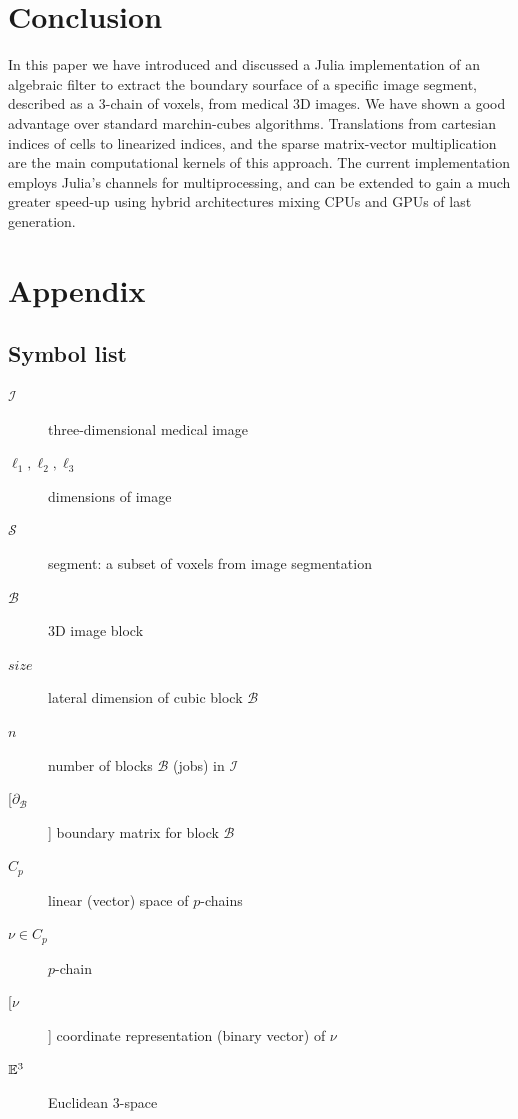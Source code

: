 \documentclass[11pt, oneside]{amsart}   	%
\begin{document}
%
\section{Conclusion}\label{sec:conclusion}

In this paper we have introduced and discussed a Julia implementation of an algebraic filter to extract the boundary sourface of a specific image segment, described as a 3-chain of voxels, from medical 3D images. We have shown a good advantage over standard marchin-cubes algorithms. Translations from cartesian indices of cells to linearized indices, and the sparse matrix-vector multiplication are the main computational kernels of this approach. The current implementation employs Julia's channels for multiprocessing, and can be extended to gain a much greater speed-up using hybrid architectures mixing  CPUs and GPUs of last generation. 

\appendix
\section{Appendix}
\subsection{Symbol list}

\begin{description}
\item[$\mathcal{I}$]  three-dimensional medical image
\item[$\ell_1, \ell_2, \ell_3$]  dimensions of image
\item[$\mathcal{S}$]  segment: a subset of voxels from image segmentation
\item[$\mathcal{B}$] 3D image block
\item[$size$] lateral dimension of cubic block $\mathcal{B}$
\item[$n$]	number of blocks $\mathcal{B}$ (jobs) in $\mathcal{I}$
\item[[$\partial_\mathcal{B}$] ]  boundary matrix for block $\mathcal{B}$
\item[$C_p$] linear (vector) space of $p$-chains
\item[$\nu\in C_p$] $p$-chain
\item[[$\nu$]] coordinate representation (binary vector) of  $\nu$
\item[$\mathbb{E}^3$] Euclidean 3-space
\end{description}
\end{document}
